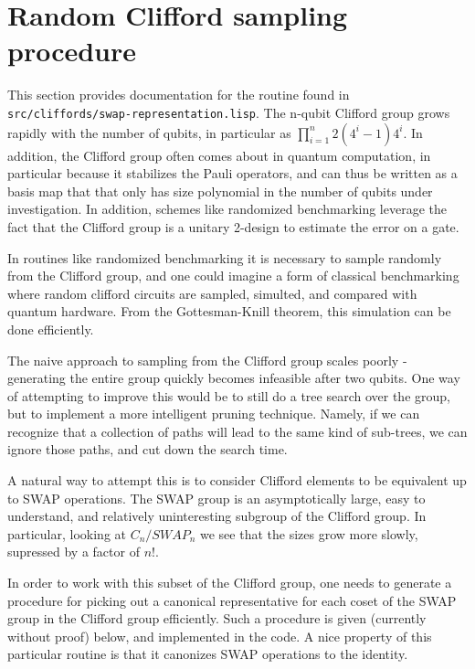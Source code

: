 
\section{Random Clifford sampling procedure}

This section provides documentation for the routine found in \texttt{src/cliffords/swap-representation.lisp}. The n-qubit Clifford group grows rapidly with the number of qubits, in particular as $\prod^n_{i=1} 2(4^i - 1)4^i$. In addition, the Clifford group often comes about in quantum computation, in particular because it stabilizes the Pauli operators, and can thus be written as a basis map that that only has size polynomial in the number of qubits under investigation. In addition, schemes like randomized benchmarking leverage the fact that the Clifford group is a unitary 2-design to estimate the error on a gate.

In routines like randomized benchmarking it is necessary to sample randomly from the Clifford group, and one could imagine a form of classical benchmarking where random clifford circuits are sampled, simulted, and compared with quantum hardware. From the Gottesman-Knill theorem, this simulation can be done efficiently.

The naive approach to sampling from the Clifford group scales poorly - generating the entire group quickly becomes infeasible after two qubits. One way of attempting to improve this would be to still do a tree search over the group, but to implement a more intelligent pruning technique. Namely, if we can recognize that a collection of paths will lead to the same kind of sub-trees, we can ignore those paths, and cut down the search time.

A natural way to attempt this is to consider Clifford elements to be equivalent up to SWAP operations. The SWAP group is an asymptotically large, easy to understand, and relatively uninteresting subgroup of the Clifford group. In particular, looking at $C_n/SWAP_n$ we see that the sizes grow more slowly, supressed by a factor of $n!$.

In order to work with this subset of the Clifford group, one needs to generate a procedure for picking out a canonical representative for each coset of the SWAP group in the Clifford group efficiently. Such a procedure is given (currently without proof) below, and implemented in the code. A nice property of this particular routine is that it canonizes SWAP operations to the identity.

